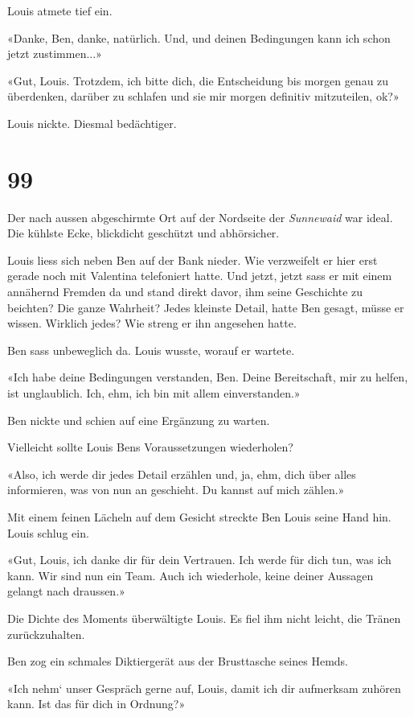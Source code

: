 Louis atmete tief ein.

«Danke, Ben, danke, natürlich. Und, und deinen Bedingungen kann ich
schon jetzt zustimmen...»

«Gut, Louis. Trotzdem, ich bitte dich, die Entscheidung bis morgen genau
zu überdenken, darüber zu schlafen und sie mir morgen definitiv
mitzuteilen, ok?»

Louis nickte. Diesmal bedächtiger.

\chapter{99}\label{section-99}

Der nach aussen abgeschirmte Ort auf der Nordseite der \emph{Sunnewaid}
war ideal. Die kühlste Ecke, blickdicht geschützt und abhörsicher.

Louis liess sich neben Ben auf der Bank nieder. Wie verzweifelt er hier
erst gerade noch mit Valentina telefoniert hatte. Und jetzt, jetzt sass
er mit einem annähernd Fremden da und stand direkt davor, ihm seine
Geschichte zu beichten? Die ganze Wahrheit? Jedes kleinste Detail, hatte
Ben gesagt, müsse er wissen. Wirklich jedes? Wie streng er ihn angesehen
hatte.

Ben sass unbeweglich da. Louis wusste, worauf er wartete.

«Ich habe deine Bedingungen verstanden, Ben. Deine Bereitschaft, mir zu
helfen, ist unglaublich. Ich, ehm, ich bin mit allem einverstanden.»

Ben nickte und schien auf eine Ergänzung zu warten.

Vielleicht sollte Louis Bens Voraussetzungen wiederholen?

«Also, ich werde dir jedes Detail erzählen und, ja, ehm, dich über alles
informieren, was von nun an geschieht. Du kannst auf mich zählen.»

Mit einem feinen Lächeln auf dem Gesicht streckte Ben Louis seine Hand
hin. Louis schlug ein.

«Gut, Louis, ich danke dir für dein Vertrauen. Ich werde für dich tun,
was ich kann. Wir sind nun ein Team. Auch ich wiederhole, keine deiner
Aussagen gelangt nach draussen.»

Die Dichte des Moments überwältigte Louis. Es fiel ihm nicht leicht, die
Tränen zurückzuhalten.

Ben zog ein schmales Diktiergerät aus der Brusttasche seines Hemds.

«Ich nehm` unser Gespräch gerne auf, Louis, damit ich dir aufmerksam
zuhören kann. Ist das für dich in Ordnung?»

